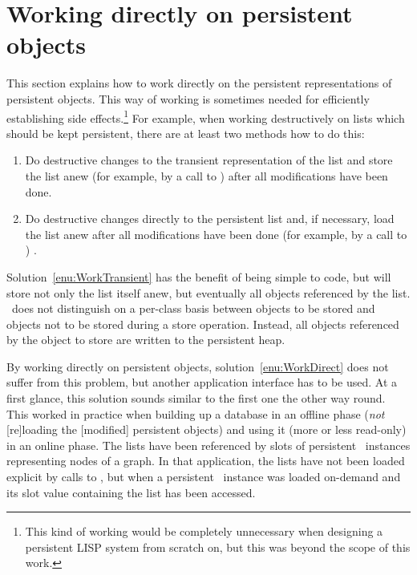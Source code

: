 \section[Direct Interface]%
{Working directly on persistent objects}%
\label{sec:DirectBinding}

This section explains how to work directly on the persistent
representations of persistent objects. This way of working is
sometimes needed for efficiently establishing side
effects.\footnote{This kind of working would be completely unnecessary
  when designing a persistent LISP system from scratch on, but this
  was beyond the scope of this work.} For example, when working
destructively on lists which should be kept persistent, there are at
least two methods how to do this:
\begin{enumerate}

\item\label{enu:WorkTransient} Do destructive changes to the transient
  representation of the list and store the list anew (for example, by
  a call to ) after all modifications have been
  done.

\item\label{enu:WorkDirect} Do destructive changes directly to the
  persistent list and, if necessary, load the list anew after all
  modifications have been done (for example, by a call to
  ) .

\end{enumerate}
Solution~\ref{enu:WorkTransient} has the benefit of being simple to
code, but will store not only the list itself anew, but eventually all
objects referenced by the list. \plob\ does not distinguish on a
per-class basis between objects to be stored and objects not to be
stored during a store operation. Instead, all objects referenced by
the object to store are written to the persistent heap.

By working directly on persistent objects,
solution~\ref{enu:WorkDirect} does not suffer from this problem, but
another application interface has to be used. At a first glance, this
solution sounds similar to the first one the other way round. This
worked in practice when building up a database in an offline phase
(\emph{not} [re]loading the [modified] persistent objects) and using
it (more or less read-only) in an online phase. The lists have been
referenced by slots of persistent \clos\ instances representing nodes
of a graph. In that application, the lists have not been loaded
explicit by calls to , but when a persistent
\clos\ instance was loaded on-demand and its slot value containing the
list has been accessed.

